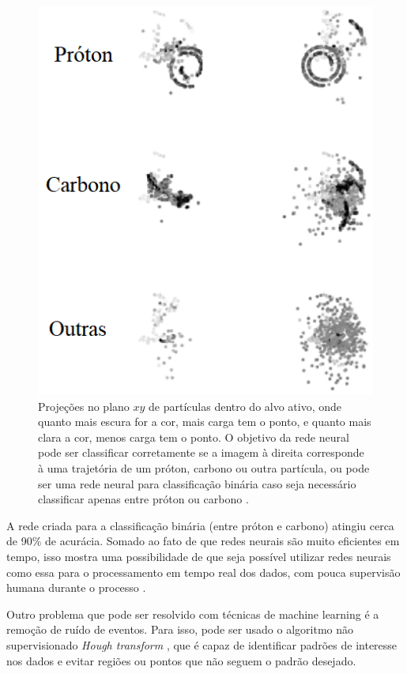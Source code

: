 \documentclass[a4paper,12pt,oneside]{book}
\begin{document}
\begin{appendices}
\begin{figure}[H]
    \centering
    \includegraphics[scale = 0.5]{figs/tpc_ml.png}
    \caption{Projeções no plano $xy$ de partículas dentro do alvo ativo, onde quanto mais escura for a cor, mais carga tem o ponto, e quanto mais clara a cor, menos carga tem o ponto. O objetivo da rede neural pode ser classificar corretamente se a imagem à direita corresponde à uma trajetória de um próton, carbono ou outra partícula, ou pode ser uma rede neural para classificação binária caso seja necessário classificar apenas entre próton ou carbono \cite{KUCHERAML}.}
    \label{fig:tpc_ml}
\end{figure}

\par A rede criada para a classificação binária (entre próton e carbono) atingiu cerca de 90\% de acurácia. Somado ao fato de que redes neurais são muito eficientes em tempo, isso mostra uma possibilidade de que seja possível utilizar redes neurais como essa para o processamento em tempo real dos dados, com pouca supervisão humana durante o processo \cite{KUCHERAML}.

\par Outro problema que pode ser resolvido com técnicas de machine learning é a remoção de ruído de eventos. Para isso, pode ser usado o algoritmo não supervisionado \textit{Hough transform} \cite{hough}, que é capaz de identificar padrões de interesse nos dados e evitar regiões ou pontos que não seguem o padrão desejado. 



\end{appendices}
\end{document}
